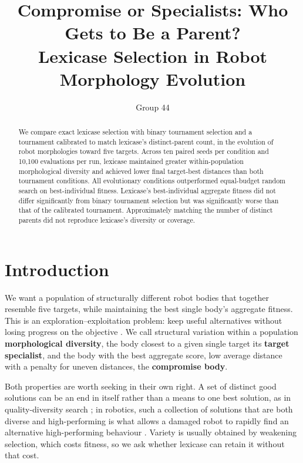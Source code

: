 \documentclass[sigconf]{acmart}
\title{Compromise or Specialists: Who Gets to Be a Parent?\texorpdfstring{\\}{ }Lexicase Selection in Robot Morphology Evolution}
\author{Group 44}
\affiliation{\institution{Vrije Universiteit Amsterdam}\country{The Netherlands}}
\begin{document}

\begin{abstract}
We compare exact lexicase selection with binary tournament selection and a tournament calibrated to match lexicase's distinct-parent count, in the evolution of robot morphologies toward five targets. Across ten paired seeds per condition and 10,100 evaluations per run, lexicase maintained greater within-population morphological diversity and achieved lower final target-best distances than both tournament conditions. All evolutionary conditions outperformed equal-budget random search on best-individual fitness. Lexicase's best-individual aggregate fitness did not differ significantly from binary tournament selection but was significantly worse than that of the calibrated tournament. Approximately matching the number of distinct parents did not reproduce lexicase's diversity or coverage.
\end{abstract}
\maketitle
\pagestyle{plain}
\raggedbottom

\section{Introduction}
We want a population of structurally different robot bodies that together resemble five targets, while maintaining the best single body's aggregate fitness. This is an exploration--exploitation problem: keep useful alternatives without losing progress on the objective \cite{crepinsek2013}. We call structural variation within a population \textbf{morphological diversity}, the body closest to a given single target its \textbf{target specialist}, and the body with the best aggregate score, low average distance with a penalty for uneven distances, the \textbf{compromise body}.

Both properties are worth seeking in their own right. A set of distinct good solutions can be an end in itself rather than a means to one best solution, as in quality-diversity search \cite{pugh2016}; in robotics, such a collection of solutions that are both diverse and high-performing is what allows a damaged robot to rapidly find an alternative high-performing behaviour \cite{cully2015}. Variety is usually obtained by weakening selection, which costs fitness, so we ask whether lexicase can retain it without that cost.
\end{document}
